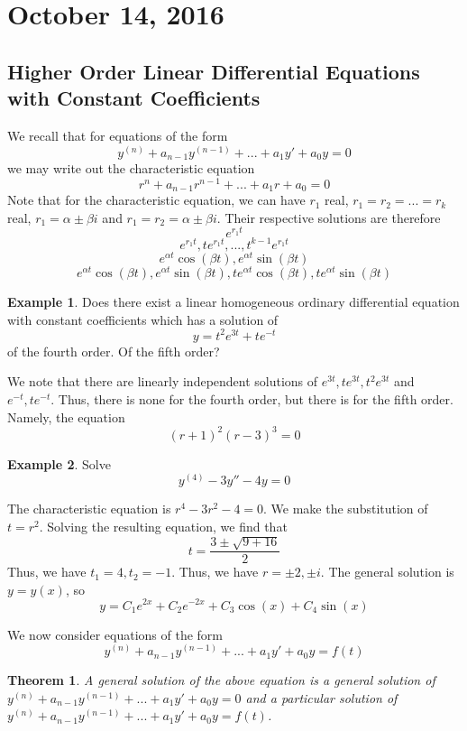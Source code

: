 \documentclass[11pt]{article}
\theoremstyle{plain} %
\newtheorem*{theorem}{Theorem}
\theoremstyle{definition}
\theoremstyle{example}
\newtheorem*{example}{Example}
\theoremstyle{remark}
\begin{document}
\section{October 14, 2016}
\subsection{Higher Order Linear Differential Equations with Constant Coefficients}

We recall that for equations of the form 
$$y^{(n)}  + a_{n-1}y^{(n-1)} + ... + a_1y' + a_0y = 0$$
we may write out the characteristic equation 
$$r^n + a_{n-1}r^{n-1} + ... + a_1r + a_0 = 0$$
Note that for the characteristic equation, we can have $r_1$ real, $r_1 = r_2 = ... = r_k$ real, $r_1 = \alpha \pm \beta i$ and $r_1 = r_2 = \alpha \pm \beta i$. Their respective solutions are therefore $$e^{r_1t}$$ $$e^{r_1t}, te^{r_1t}, ..., t^{k-1}e^{r_1t}$$ $$e^{\alpha t}\cos(\beta t), e^{\alpha t}\sin(\beta t)$$ $$e^{\alpha t}\cos(\beta t), e^{\alpha t}\sin(\beta t), te^{\alpha t}\cos(\beta t), te^{\alpha t}\sin(\beta t)$$

\begin{example}
Does there exist a linear homogeneous ordinary differential equation with constant coefficients which has a solution of $$y = t^2e^{3t} + te^{-t}$$ of the fourth order. Of the fifth order?
\end{example}

We note that there are linearly independent solutions of $e^{3t}, te^{3t}, t^2e^{3t}$ and $e^{-t}, te^{-t}$. Thus, there is none for the fourth order, but there is for the fifth order. Namely, the equation $$(r+1)^2(r-3)^3=0$$

\begin{example}
Solve $$y^{(4)}-3y''-4y = 0$$
\end{example}
The characteristic equation is $r^4-3r^2-4=0$. We make the substitution of $t=r^2$. Solving the resulting equation, we find that $$t = \frac{3 \pm \sqrt{9 + 16}}{2}$$ Thus, we have $t_1 = 4, t_2 = -1$. Thus, we have $r = \pm 2, \pm i$. The general solution is $y = y(x)$, so $$y = C_1e^{2x} + C_2e^{-2x} + C_3\cos(x) + C_4\sin(x)$$

We now consider equations of the form $$y^{(n)}  + a_{n-1}y^{(n-1)} + ... + a_1y' + a_0y = f(t)$$
\begin{theorem}
A general solution of the above equation is a general solution of $y^{(n)}  + a_{n-1}y^{(n-1)} + ... + a_1y' + a_0y = 0$ and a particular solution of $y^{(n)}  + a_{n-1}y^{(n-1)} + ... + a_1y' + a_0y = f(t)$.
\end{theorem}
\end{document}

